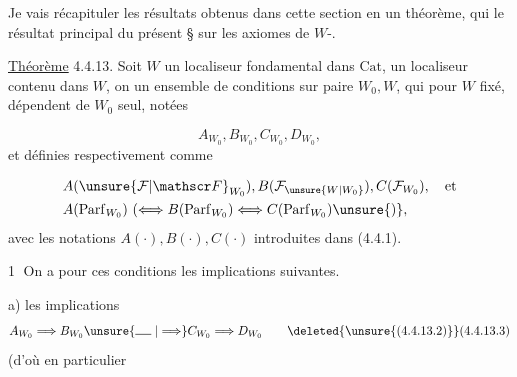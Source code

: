 
Je vais récapituler les résultats obtenus dans cette section en un théorème, qui  le résultat principal du présent \S{} sur les axiomes de $W$-.

\uline{Théorème} 4.4.13. Soit $W$ un localiseur fondamental dans $\mathrm{Cat}$,  un localiseur  contenu dans $W$, on  un ensemble de  conditions sur  paire $W_0,W$, qui pour $W$ fixé, dépendent de $W_0$ seul, notées

\[
 A_{W_0}, B_{W_0}, C_{W_0}, D_{W_0},\tag*{(4.4.13.1)}
\]
et définies  respectivement comme

\[
\begin{aligned}
 &A(\unsure{\mathcal F|\mathscr F}_{W_0}),B(\mathcal F_{\unsure{W|W_0}}),C(\mathcal F_{W_0}),\quad\text{et}\\
 &A(\mathrm{Parf}_{W_0})\ (\Longleftrightarrow B(\mathrm{Parf}_{W_0})\Longleftrightarrow C(\mathrm{Parf}_{W_0})\unsure{)}, 
\end{aligned}
\]
avec les notations $A(\cdot),B(\cdot),C(\cdot)$ introduites dans (4.4.1).  
\inserted{\[
 A,\ B,\ C,\ D \tag*{(4.4.13.2)}
\]}

\textcircled{1} On a pour ces conditions les  implications suivantes.

a)  les implications 
\deleted{\[
 A_{\unsure{W_0|W'_0}}\Longrightarrow A_{W'_0},\ B_{W_0}\unsure{\Rightarrow|=}
\]}
\[
 A_{W_0}\Longrightarrow B_{W_0}\unsure{\mathrel{\rule{1.3em}{.5pt}}|\Longrightarrow} C_{W_0}\Longrightarrow D_{W_0}
 \tag*{\deleted{\unsure{(4.4.13.2)}}(4.4.13.3)}
\]
(d'où en particulier
